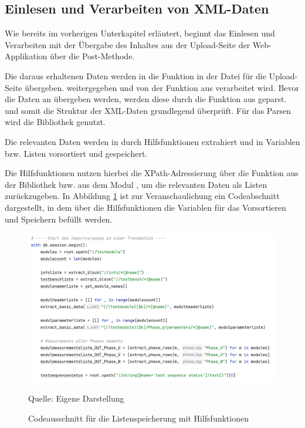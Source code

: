 \subsection{Einlesen und Verarbeiten von XML-Daten}
\label{subsec:einlesen-und-verarbeiten-von-xml-daten}

Wie bereits im vorherigen Unterkapitel erläutert, beginnt das Einlesen und Verarbeiten mit der Übergabe des Inhaltes aus der
Upload-Seite der Web-Applikation über die Post-Methode.

Die daraus erhaltenen Daten werden in die Funktion  in der Datei  für die Upload-Seite übergeben.
weitergegeben und von der Funktion  aus  verarbeitet wird.
Bevor die Daten an  übergeben werden, werden diese durch die Funktion  aus
 geparst.
und somit die Struktur der XML-Daten grundlegend überprüft.
Für das Parsen wird die Bibliothek  genutzt.

Die relevanten Daten werden in  durch Hilfsfunktionen extrahiert und in Variablen bzw. Listen
vorsortiert und gespeichert.

Die Hilfsfunktionen nutzen hierbei die XPath-Adressierung über die Funktion  aus der Bibliothek 
bzw. aus dem Modul , um die relevanten Daten als Listen zurückzugeben.
In Abbildung \ref{fig: Codeausschnitt für die Listenspeicherung mit Hilfsfunktionen} ist zur Veranschaulichung ein Codeabschnitt dargestellt, in dem über die Hilfsfunktionen die Variablen
für das Vorsortieren und Speichern befüllt werden.

\begin{figure}[H]
    \centering
    \includegraphics[width=1\textwidth]{Grafiken/5.3 Listen}
    \caption{Codeausschnitt für die Listenspeicherung mit Hilfsfunktionen}
    \label{fig: Codeausschnitt für die Listenspeicherung mit Hilfsfunktionen}
    {Quelle: Eigene Darstellung}
\end{figure}

